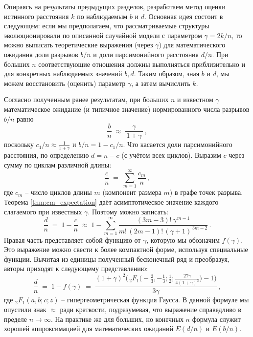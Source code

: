 Опираясь на результаты предыдущих разделов, разработаем метод оценки истинного расстояния $k$ по наблюдаемым $b$ и $d$. Основная идея состоит в следующем: если мы предполагаем, что рассматриваемые структуры эволюционировали по описанной случайной модели с параметром $\gamma = 2k/n$, то можно выписать теоретические выражения (через $\gamma$) для математического ожидания доли разрывов $b/n$ и доли парсимонийного расстояния $d/n$. При больших $n$ соответствующие отношения должны выполняться приблизительно и для конкретных наблюдаемых значений $b, d$. Таким образом, зная $b$ и $d$, мы можем восстановить (оценить) параметр $\gamma$, а затем вычислить $k$.

Согласно полученным ранее результатам, при больших $n$ и известном $\gamma$ математическое ожидание (и типичное значение) нормированного числа разрывов $b/n$ равно 
\[
\frac{b}{n} \;\approx\; \frac{\gamma}{\,1+\gamma\,}\,,
\] 
поскольку $c_1/n \approx \frac{1}{1+\gamma}$ и $b/n = 1 - c_1/n$. Что касается доли парсимонийного расстояния, по определению $d = n - c$ (с учётом всех циклов). Выразим $c$ через сумму по циклам различной длины: 
\[
\frac{c}{n} \;=\; \sum_{m=1}^{\infty} \frac{c_m}{n}\,,
\] 
где $c_m$ -- число циклов длины $m$ (компонент размера $m$) в графе точек разрыва. Теорема \ref{thm:cm_expectation} даёт асимптотическое значение каждого слагаемого при известных $\gamma$. Поэтому можно записать:
\[
\frac{d}{n} \;=\; 1 - \frac{c}{n} \;\approx\; 1 - \sum_{m=1}^{\infty} \frac{(3m-3)!\, \gamma^{\,m-1}}{m!\, (2m-1)! \, (\gamma+1)^{\,3m-2}}\,. 
\] 
Правая часть представляет собой функцию от $\gamma$, которую мы обозначим $f(\gamma)$. Это выражение можно свести к более компактной форме, используя специальные функции. Вычитая из единицы полученный бесконечный ряд и преобразуя, авторы приходят к следующему представлению:
\begin{equation}\label{eq:d_hyper}
\frac{d}{n} \;=\; 1 - f(\gamma) \;=\; \frac{(1+\gamma)^2\Big(\,_2F_1\!\big(-\tfrac{2}{3}, -\tfrac{1}{3}; \tfrac{1}{2}; \frac{27\gamma}{4(1+\gamma)^3}\big) - 1\Big)}{3\gamma}\,,
\end{equation}
где $_2F_1(a,b;c;z)$ -- гипергеометрическая функция Гаусса. В данной формуле мы опустили знак $\approx$ ради краткости, подразумевая, что выражение справедливо в пределе $n \to \infty$.
На практике же для больших, но конечных $n$ формула служит хорошей аппроксимацией для математических ожиданий $E(d/n)$ и $E(b/n)$.

